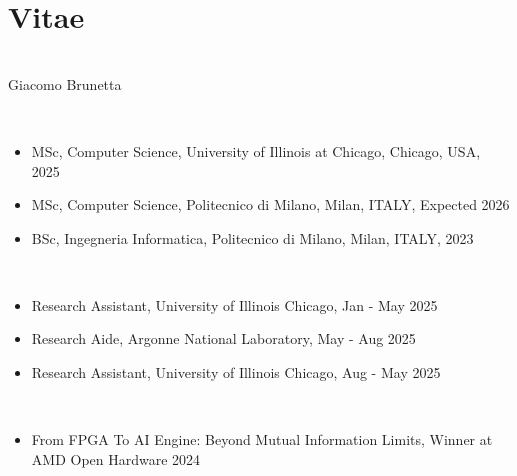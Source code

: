 \chapter*{Vitae}
\begin{singlespace}
    \begin{description}[labelwidth=2cm,leftmargin=2.2cm,itemsep=1em]

        \item[NAME] \phantom{.} \\ Giacomo Brunetta

        \item[EDUCATION] \phantom{.} \\
            \begin{itemize}[label={},listparindent=0pt,itemindent=0pt,leftmargin=0pt,itemsep=1em,parsep=0pt,topsep=0pt,partopsep=0pt]

                \item MSc, Computer Science, University of Illinois at Chicago, Chicago, USA, 2025
                \item MSc, Computer Science, Politecnico di Milano, Milan, ITALY, Expected 2026
                \item BSc, Ingegneria Informatica, Politecnico di Milano, Milan, ITALY, 2023

                

            \end{itemize}
        \item[PROFESSIONAL EXPERIENCE] \phantom{.} \\
            \begin{itemize}[label={},listparindent=0pt,itemindent=0pt,leftmargin=0pt,itemsep=1em,parsep=0pt,topsep=0pt,partopsep=0pt]

                \item Research Assistant, University of Illinois Chicago, Jan - May 2025
                \item Research Aide, Argonne National Laboratory, May - Aug 2025
                \item Research Assistant, University of Illinois Chicago, Aug - May 2025

            \end{itemize}

        \item[AWARDS] \phantom{.} \\
            \begin{itemize}[label={},listparindent=0pt,itemindent=0pt,leftmargin=0pt,itemsep=1em,parsep=0pt,topsep=0pt,partopsep=0pt]
                \item From FPGA To AI Engine: Beyond Mutual Information Limits, Winner at AMD Open Hardware 2024
            \end{itemize}
    \end{description}
\end{singlespace}
